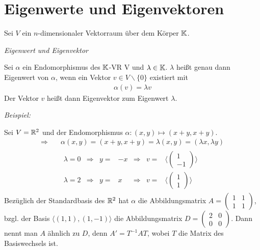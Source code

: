 \section{Eigenwerte und Eigenvektoren}

Sei $V$ ein $n$-dimensionaler Vektorraum über dem Körper $\mathbb{K}$.

\begin{mydef}\textit{Eigenwert und Eigenvektor}\medskip

    Sei $\alpha$ ein Endomorphismus des $\mathbb{K}$-VR V und $\lambda\in \mathbb{K}$. $\lambda$ heißt genau dann Eigenwert von $\alpha$, wenn ein Vektor $v\in 
    V\backslash\lbrace0\rbrace$ existiert mit
    \begin{align*}
        \alpha(v) = \lambda v
    \end{align*}
    Der Vektor $v$ heißt dann Eigenvektor zum Eigenwert $\lambda$.
\end{mydef}

\textit{Beispiel:}\medskip

Sei $V=\mathbb{R}^2$ und der Endomorphismus $\alpha:(x,y)\mapsto (x+y,x+y)$.
\begin{align*}
    \Rightarrow \quad & \alpha(x,y)=(x+y,x+y) = \lambda(x,y)=(\lambda x,\lambda y)\\
    & \begin{array}{cccrccc}
        \lambda=0 & \Rightarrow & y= & -x & \Rightarrow & v= &\langle \begin{pmatrix}1\\-1\end{pmatrix} \rangle \\
        \lambda=2 & \Rightarrow & y= &  x & \Rightarrow & v= &\langle \begin{pmatrix}1\\ 1\end{pmatrix} \rangle
    \end{array}
\end{align*}
Bezüglich der Standardbasis des $\mathbb{R}^2$ hat $\alpha$ die Abbildungsmatrix $A=\begin{pmatrix}1&1\\1&1\end{pmatrix}$, bzgl. der Basis $\langle(1,1),(1,-1)\rangle$ die
Abbildungsmatrix $D=\begin{pmatrix}2&0\\0&0\end{pmatrix}$. Dann nennt man $A$ ähnlich zu $D$, denn $A'=T^{-1}AT$, wobei $T$ die Matrix des Basiswechsels ist.\\


